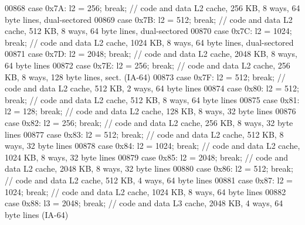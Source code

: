 \begin{DoxyCode}
{00868       \textcolor{keywordflow}{case} 0x7A: l2 = 256; \textcolor{keywordflow}{break};   \textcolor{comment}{// code and data L2 cache, 256 KB, 8 ways, 64 byte lines, dual-sectored}
00869       \textcolor{keywordflow}{case} 0x7B: l2 = 512; \textcolor{keywordflow}{break};   \textcolor{comment}{// code and data L2 cache, 512 KB, 8 ways, 64 byte lines, dual-sectored}
00870       \textcolor{keywordflow}{case} 0x7C: l2 = 1024; \textcolor{keywordflow}{break};   \textcolor{comment}{// code and data L2 cache, 1024 KB, 8 ways, 64 byte lines,
       dual-sectored}
00871       \textcolor{keywordflow}{case} 0x7D: l2 = 2048; \textcolor{keywordflow}{break};   \textcolor{comment}{// code and data L2 cache, 2048 KB, 8 ways, 64 byte lines}
00872       \textcolor{keywordflow}{case} 0x7E: l2 = 256; \textcolor{keywordflow}{break};   \textcolor{comment}{// code and data L2 cache, 256 KB, 8 ways, 128 byte lines, sect.
       (IA-64)}
00873       \textcolor{keywordflow}{case} 0x7F: l2 = 512; \textcolor{keywordflow}{break};   \textcolor{comment}{// code and data L2 cache, 512 KB, 2 ways, 64 byte lines}
00874       \textcolor{keywordflow}{case} 0x80: l2 = 512; \textcolor{keywordflow}{break};   \textcolor{comment}{// code and data L2 cache, 512 KB, 8 ways, 64 byte lines}
00875       \textcolor{keywordflow}{case} 0x81: l2 = 128; \textcolor{keywordflow}{break};   \textcolor{comment}{// code and data L2 cache, 128 KB, 8 ways, 32 byte lines}
00876       \textcolor{keywordflow}{case} 0x82: l2 = 256; \textcolor{keywordflow}{break};   \textcolor{comment}{// code and data L2 cache, 256 KB, 8 ways, 32 byte lines}
00877       \textcolor{keywordflow}{case} 0x83: l2 = 512; \textcolor{keywordflow}{break};   \textcolor{comment}{// code and data L2 cache, 512 KB, 8 ways, 32 byte lines}
00878       \textcolor{keywordflow}{case} 0x84: l2 = 1024; \textcolor{keywordflow}{break};   \textcolor{comment}{// code and data L2 cache, 1024 KB, 8 ways, 32 byte lines}
00879       \textcolor{keywordflow}{case} 0x85: l2 = 2048; \textcolor{keywordflow}{break};   \textcolor{comment}{// code and data L2 cache, 2048 KB, 8 ways, 32 byte lines}
00880       \textcolor{keywordflow}{case} 0x86: l2 = 512; \textcolor{keywordflow}{break};   \textcolor{comment}{// code and data L2 cache, 512 KB, 4 ways, 64 byte lines}
00881       \textcolor{keywordflow}{case} 0x87: l2 = 1024; \textcolor{keywordflow}{break};   \textcolor{comment}{// code and data L2 cache, 1024 KB, 8 ways, 64 byte lines}
00882       \textcolor{keywordflow}{case} 0x88: l3 = 2048; \textcolor{keywordflow}{break};   \textcolor{comment}{// code and data L3 cache, 2048 KB, 4 ways, 64 byte lines (IA-64)}
}
\end{DoxyCode}
